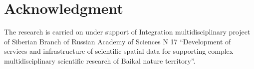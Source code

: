 \documentclass[conference]{IEEEtran}
\begin{document}
\section*{Acknowledgment}
The research is carried on under support of Integration multidisciplinary project of Siberian Branch of Russian Academy of Sciences N 17 “Development of services and infrastructure of scientific spatial data for supporting complex multidisciplinary scientific research of Baikal nature territory”.







\end{document}
